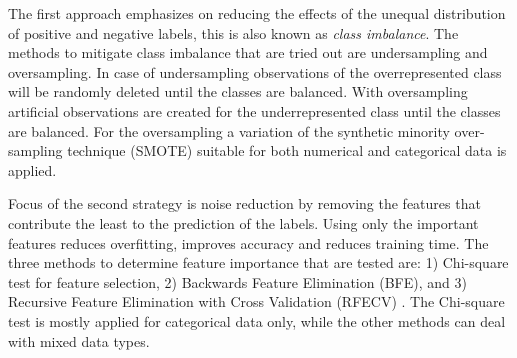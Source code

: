 The first approach emphasizes on reducing the effects of the unequal distribution of positive and negative labels, this is also known as \textit{class imbalance}. 
The methods to mitigate class imbalance that are tried out are undersampling and oversampling. 
In case of undersampling observations of the overrepresented class will be randomly deleted until the classes are balanced. 
With oversampling artificial observations are created for the underrepresented class until the classes are balanced. 
For the oversampling a variation of the synthetic minority over-sampling technique (SMOTE) \cite{chawla2002smote} suitable for both numerical and categorical data is applied. 

Focus of the second strategy is noise reduction by removing the features that contribute the least to the prediction of the labels.
Using only the important features reduces overfitting, improves accuracy and reduces training time. 
The three methods to determine feature importance that are tested are: 1) Chi-square test for feature selection, 2) Backwards Feature Elimination (BFE), and 3) Recursive Feature Elimination with Cross Validation (RFECV) \cite{guyon2002gene}. 
The Chi-square test is mostly applied for categorical data only, while the other methods can deal with mixed data types.
